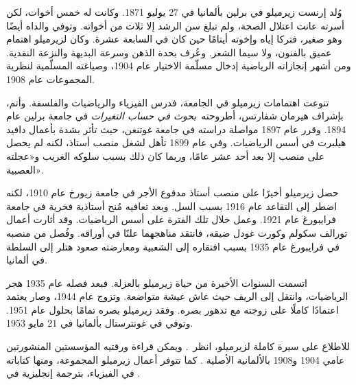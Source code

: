 \documentclass[../../../include/open-logic-section]{subfiles}
\begin{document}



وُلد إرنست زيرميلو في برلين بألمانيا في 27 يوليو 1871. وكانت له خمس
أخوات، لكن أسرته عانت اعتلال الصحة، ولم تبلغ سن الرشد إلا ثلاث من
أخواته. وتوفي والداه أيضًا وهو صغير، فتركا إياه وإخوته أيتامًا حين
كان في السابعة عشرة. وكان لزيرميلو اهتمام عميق بالفنون، ولا سيما
الشعر. وعُرف بحدة الذهن وسرعة البديهة والنزعة النقدية. ومن أشهر
إنجازاته الرياضية إدخال مسلّمة الاختيار عام 1904، وصياغته المسلّمية
لنظرية المجموعات عام 1908.

تنوعت اهتمامات زيرميلو في الجامعة، فدرس الفيزياء والرياضيات والفلسفة.
وأتم، بإشراف هيرمان شفارتس، أطروحته~\emph{بحوث في حساب التغيرات} في
جامعة برلين عام 1894. وقرر عام 1897 مواصلة دراسته في جامعة غوتنغن،
حيث تأثر بشدة بأعمال دافيد هيلبرت في أسس الرياضيات. وفي عام 1899 تأهل
لشغل منصب أستاذ، لكنه لم يحصل على منصب إلا بعد أحد عشر عامًا، وربما
كان ذلك بسبب سلوكه الغريب و«عجلته العصبية».

حصل زيرميلو أخيرًا على منصب أستاذ مدفوع الأجر في جامعة زيورخ عام
1910، لكنه اضطر إلى التقاعد عام 1916 بسبب السل. وبعد تعافيه مُنح
أستاذية فخرية في جامعة فرايبورغ عام 1921. وعمل خلال تلك الفترة على
أسس الرياضيات. وقد أثارت أعمال تورالف سكولم وكورت غودل ضيقه، فانتقد
مناهجهما علنًا في أوراقه. وفُصل من منصبه في فرايبورغ عام 1935 بسبب
افتقاره إلى الشعبية ومعارضته صعود هتلر إلى السلطة في ألمانيا.

اتسمت السنوات الأخيرة من حياة زيرميلو بالعزلة. فبعد فصله عام 1935
هجر الرياضيات، وانتقل إلى الريف حيث عاش عيشة متواضعة. وتزوج عام 1944،
وصار يعتمد اعتمادًا كاملًا على زوجته مع تدهور بصره. وفقد زيرميلو بصره
تمامًا بحلول عام 1951. وتوفي في غونترستال بألمانيا في 21 مايو 1953.

\begin{reading}
للاطلاع على سيرة كاملة لزيرميلو، انظر~\citet{Ebbinghaus2015}. ويمكن
قراءة ورقتيه المؤسستين المنشورتين عامي 1904 و1908 بالألمانية الأصلية
\citep{Zermelo1904,Zermelo1908}. كما تتوفر أعمال زيرميلو المجموعة،
ومنها كتاباته في الفيزياء، بترجمة إنجليزية في
\citep{Ebbinghaus2010,Ebbinghaus2013}.
\end{reading}
\end{document}

